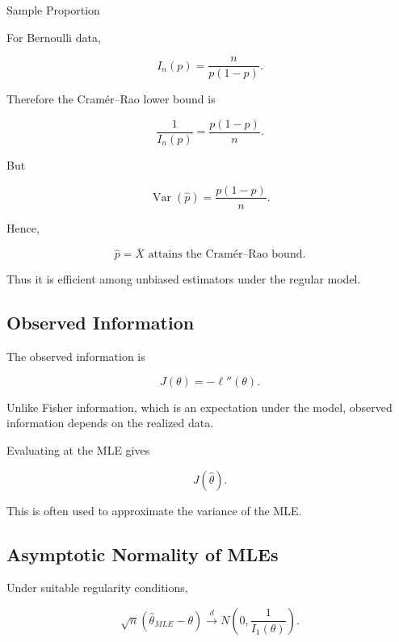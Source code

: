 \begin{workedexamplebox}{Sample Proportion}

For Bernoulli data,

\[
I_n(p)
=
\frac{n}{
p(1-p)
}.
\]

Therefore the Cram\'er--Rao lower bound is

\[
\frac1{I_n(p)}
=
\frac{
p(1-p)
}{n}.
\]

But

\[
\operatorname{Var}(\widehat{p})
=
\frac{
p(1-p)
}{n}.
\]

Hence,

\begin{answerbox}
\[
\boxed{
\widehat{p}
=
\overline{X}
\text{ attains the Cram\'er--Rao bound}.
}
\]
\end{answerbox}

Thus it is efficient among unbiased estimators under the regular model.

\end{workedexamplebox}

\subsection{Observed Information}
\label{subsec:observed-information}

The observed information is

\[
\boxed{
J(\theta)
=
-
\ell''(\theta).
}
\]

Unlike Fisher information, which is an expectation under the model,
observed information depends on the realized data.

Evaluating at the MLE gives

\[
\boxed{
J(\widehat{\theta}).
}
\]

This is often used to approximate the variance of the MLE.

\subsection{Asymptotic Normality of MLEs}
\label{subsec:asymptotic-normality-mle}

Under suitable regularity conditions,

\[
\boxed{
\sqrt{n}
(
\widehat{\theta}_{MLE}
-
\theta
)
\xrightarrow{d}
N
\left(
0,
\frac1{I_1(\theta)}
\right).
}
\]

